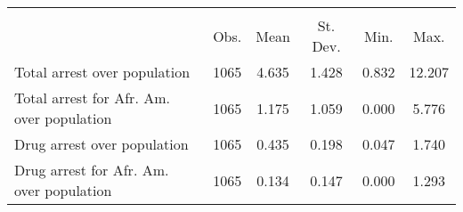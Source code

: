 {
\def\sym#1{\ifmmode^{#1}\else\(^{#1}\)\fi}
\begin{tabular}{l*{1}{ccccc}}
\hline\hline
                    &\multicolumn{5}{c}{}                                            \\
                    &        Obs.&        Mean&    St. Dev.&        Min.&        Max.\\
\hline
Total arrest over population&        1065&       4.635&       1.428&       0.832&      12.207\\
Total arrest for Afr. Am. over population&        1065&       1.175&       1.059&       0.000&       5.776\\
Drug arrest over population&        1065&       0.435&       0.198&       0.047&       1.740\\
Drug arrest for Afr. Am. over population&        1065&       0.134&       0.147&       0.000&       1.293\\
\hline\hline
\end{tabular}
}
